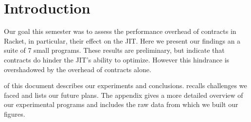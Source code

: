 \section{Introduction}
\label{intro}

Our goal this semester was to assess the performance overhead of contracts in Racket, in particular, their effect on the JIT.
Here we present our findings an a suite of 7 small programs.
These results are preliminary, but indicate that contracts do hinder the JIT's ability to optimize.
However this hindrance is overshadowed by the overhead of contracts alone.

 of this document describes our experiments and conclusions.
 recalls challenges we faced and lists our future plans.
The appendix gives a more detailed overview of our experimental programs and includes the raw data from which we built our figures.
